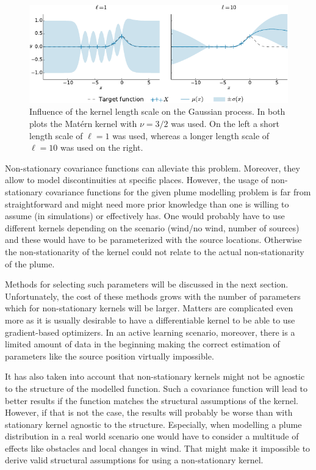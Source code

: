 \begin{figure}
    \centering
    \includegraphics{plots/gp-lengthscale}
    \caption[Length-scale influence]{Influence of the kernel length scale on the 
        Gaussian process. In both plots the Mat\'ern kernel with $\nu = 3/2$ was 
        used. On the left a short length scale of $\ell = 1$ was used, whereas 
        a longer length scale of $\ell = 10$ was used on the right.
    }\label{fig:gp-length scale}
\end{figure}

Non-stationary covariance functions can alleviate this problem. Moreover, they 
allow to model discontinuities at specific places. However, the usage of 
non-stationary covariance functions for the given plume modelling problem is far 
from straightforward and might need more prior knowledge than one is willing to 
assume (in simulations) or effectively has.  One would probably have to use 
different kernels depending on the scenario (wind/no wind, number of sources) 
and these would have to be parameterized with the source locations. Otherwise 
the non-stationarity of the kernel could not relate to the actual 
non-stationarity of the plume.

Methods for selecting such parameters will be discussed in the next section.  
Unfortunately, the cost of these methods grows with the number of parameters 
which for non-stationary kernels will be larger. Matters are complicated even 
more as it is usually desirable to have a differentiable kernel to be able to 
use gradient-based optimizers. In an active learning scenario, moreover, there 
is a limited amount of data in the beginning making the correct estimation of 
parameters like the source position virtually impossible.

It has also taken into account that non-stationary kernels might not be agnostic 
to the structure of the modelled function. Such a covariance function will lead 
to better results if the function matches the structural assumptions of the 
kernel. However, if that is not the case, the results will probably be worse 
than with stationary kernel agnostic to the structure. Especially, when 
modelling a plume distribution in a real world scenario one would have to 
consider a multitude of effects like obstacles and local changes in wind.  That 
might make it impossible to derive valid structural assumptions for using 
a non-stationary kernel.

